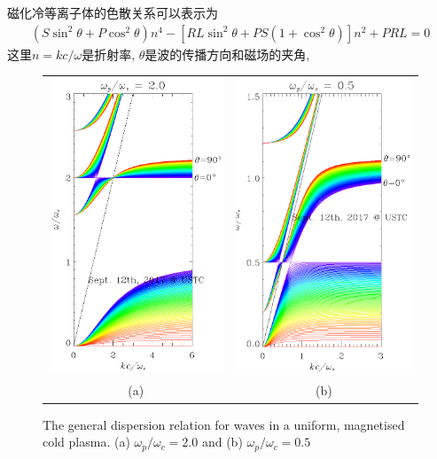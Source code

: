 \documentclass{article}
\begin{document}
	磁化冷等离子体的色散关系可以表示为\citep{Diver2001}
	\begin{align}
		\left(S \sin^2 \theta + P \cos^2 \theta\right) n^4 - \left[R L \sin^2 \theta
		+ P S \left(1 + \cos^2 \theta\right) \right] n^2 + P R L= 0 \label{Eqn:Colp}
	\end{align}
	这里$n = k c / \omega$是折射率, $\theta$是波的传播方向和磁场的夹角,
	\begin{figure}
		\begin{tabular}{cc}
			\includegraphics[width=.5\textwidth]{coldp_2_0.eps} &
			\includegraphics[width=.5\textwidth]{coldp_0_5.eps}
			\\
			(a) & (b)
		\end{tabular}
		\caption{The general dispersion relation for waves in a uniform, magnetised cold
			plasma. (a) $\omega_p / \omega_c = 2.0$ and (b) $\omega_p / \omega_c = 0.5$} \label{ColdPlasma}
	\end{figure}
\end{document}
